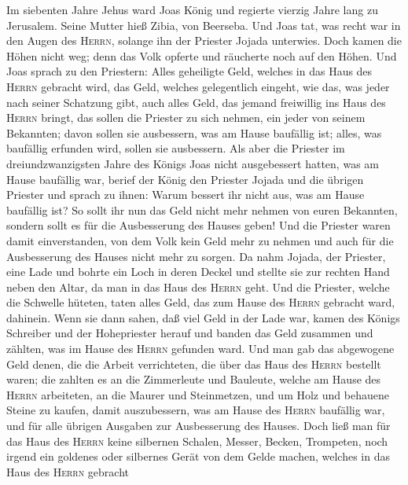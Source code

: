  Im siebenten Jahre Jehus ward Joas König und regierte
vierzig Jahre lang zu Jerusalem. Seine Mutter hieß Zibia, von Beerseba.
 Und Joas tat, was recht war in den Augen des
\textsc{Herrn}, solange ihn der Priester Jojada unterwies.
 Doch kamen die Höhen nicht weg; denn das Volk opferte und
räucherte noch auf den Höhen.  Und Joas sprach zu den
Priestern: Alles geheiligte Geld, welches in das Haus des \textsc{Herrn}
gebracht wird, das Geld, welches gelegentlich eingeht, wie das, was
jeder nach seiner Schatzung gibt, auch alles Geld, das jemand freiwillig
ins Haus des \textsc{Herrn} bringt,  das sollen die
Priester zu sich nehmen, ein jeder von seinem Bekannten; davon sollen
sie ausbessern, was am Hause baufällig ist; alles, was baufällig
erfunden wird, sollen sie ausbessern.  Als aber die
Priester im dreiundzwanzigsten Jahre des Königs Joas nicht ausgebessert
hatten, was am Hause baufällig war,  berief der König den
Priester Jojada und die übrigen Priester und sprach zu ihnen: Warum
bessert ihr nicht aus, was am Hause baufällig ist? So sollt ihr nun das
Geld nicht mehr nehmen von euren Bekannten, sondern sollt es für die
Ausbesserung des Hauses geben!  Und die Priester waren
damit einverstanden, von dem Volk kein Geld mehr zu nehmen und auch für
die Ausbesserung des Hauses nicht mehr zu sorgen.  Da nahm
Jojada, der Priester, eine Lade und bohrte ein Loch in deren Deckel und
stellte sie zur rechten Hand neben den Altar, da man in das Haus des
\textsc{Herrn} geht. Und die Priester, welche die Schwelle hüteten,
taten alles Geld, das zum Hause des \textsc{Herrn} gebracht ward,
dahinein.  Wenn sie dann sahen, daß viel Geld in der Lade
war, kamen des Königs Schreiber und der Hohepriester herauf und banden
das Geld zusammen und zählten, was im Hause des \textsc{Herrn} gefunden
ward.  Und man gab das abgewogene Geld denen, die die
Arbeit verrichteten, die über das Haus des \textsc{Herrn} bestellt
waren; die zahlten es an die Zimmerleute und Bauleute, welche am Hause
des \textsc{Herrn} arbeiteten,  an die Maurer und
Steinmetzen, und um Holz und behauene Steine zu kaufen, damit
auszubessern, was am Hause des \textsc{Herrn} baufällig war, und für
alle übrigen Ausgaben zur Ausbesserung des Hauses.  Doch
ließ man für das Haus des \textsc{Herrn} keine silbernen Schalen,
Messer, Becken, Trompeten, noch irgend ein goldenes oder silbernes Gerät
von dem Gelde machen, welches in das Haus des \textsc{Herrn} gebracht
